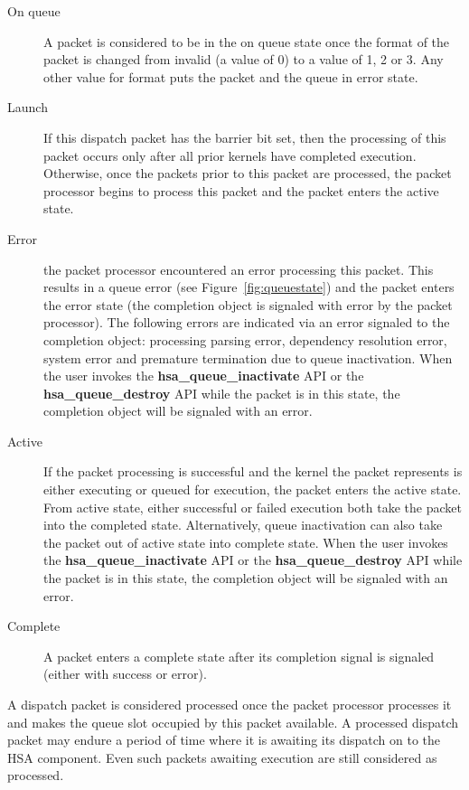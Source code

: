\documentclass[draft]{book}
\newcommand{\reffun}[1]{\textbf{#1}}
\begin{document}
\begin{description}
\item[On queue] A packet is considered to be in the on queue state once
  the format of the packet is changed from invalid (a value of 0) to a value of
  1, 2 or 3. Any other value for format puts the packet and the queue in error
  state.

\item[Launch] If this dispatch packet has the barrier bit set, then
  the processing of this packet occurs only after all prior kernels have
  completed execution. Otherwise, once the packets prior to this packet are
  processed, the packet processor begins to process this packet and the packet
  enters the active state.

\item[Error] the packet processor encountered an error processing this
  packet. This results in a queue error (see Figure~\ref{fig:queuestate}) and
  the packet enters the error state (the completion object is signaled with
  error by the packet processor). The following errors are indicated via an
  error signaled to the completion object: processing parsing error, dependency
  resolution error, system error and premature termination due to queue
  inactivation. When the user invokes the \reffun{hsa_queue_inactivate} API
  or the \reffun{hsa_queue_destroy} API while the packet is in this state, the
  completion object will be signaled with an error.

\item[Active] If the packet processing is successful and the kernel the
  packet represents is either executing or queued for execution, the packet
  enters the active state. From active state, either successful or failed
  execution both take the packet into the completed state. Alternatively, queue
  inactivation can also take the packet out of active state into complete state.
  When the user invokes the \reffun{hsa_queue_inactivate} API or the
  \reffun{hsa_queue_destroy} API while the packet is in this state, the
  completion object will be signaled with an error.

\item[Complete] A packet enters a complete state after its completion
  signal is signaled (either with success or error).
\end{description}

A dispatch packet is considered processed once the packet processor processes it
and makes the queue slot occupied by this packet available. A processed dispatch
packet may endure a period of time where it is awaiting its dispatch on to the
HSA component. Even such packets awaiting execution are still considered as
processed.
\end{document}
